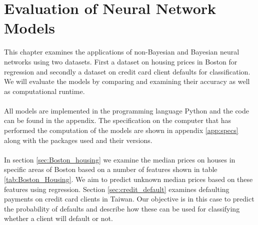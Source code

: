 \chapter{Evaluation of Neural Network Models} \label{chap:eval_NN}
This chapter examines the applications of non-Bayesian and Bayesian neural networks using two datasets. First a dataset on housing prices in Boston for regression and secondly a dataset on credit card client defaults for classification. We will evaluate the models by comparing and examining their accuracy as well as computational runtime.
\\
\\
All models are implemented in the programming language Python and the code can be found in the appendix. The specification on the computer that has performed the computation of the models are shown in appendix \ref{app:specs} along with the packages used and their versions.
\\
\\
In section \ref{sec:Boston_housing} we examine the median prices on houses in specific areas of Boston based on a number of features shown in table \ref{tab:Boston_Housing}. We aim to predict unknown median prices based on these features using regression. Section \ref{sec:credit_default} examines defaulting payments on credit card clients in Taiwan. Our objective is in this case to predict the probability of defaults and describe how these can be used for classifying whether a client will default or not.

